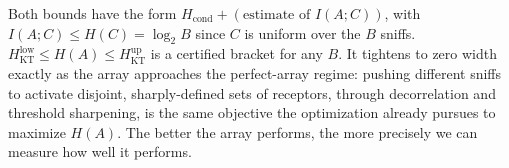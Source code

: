 \documentclass[aps,pre,superscriptaddress,floatfix,longbibliography,linenumbers]{revtex4-2}
\begin{document}
Both bounds have the form $H_\text{cond}+(\text{estimate of }I(A;C))$, with
$I(A;C)\le H(C)=\log_2 B$ since $C$ is uniform over the $B$ sniffs.
$H_\text{KT}^\text{low} \le H(A) \le H_\text{KT}^\text{up}$ is a certified
bracket for any $B$. It tightens to zero width exactly as the array
approaches the perfect-array regime: pushing different sniffs to activate
disjoint, sharply-defined sets of receptors, through decorrelation and
threshold sharpening, is the same objective the optimization already pursues
to maximize $H(A)$. The better the array performs, the more precisely we can
measure how well it performs.



\end{document}
